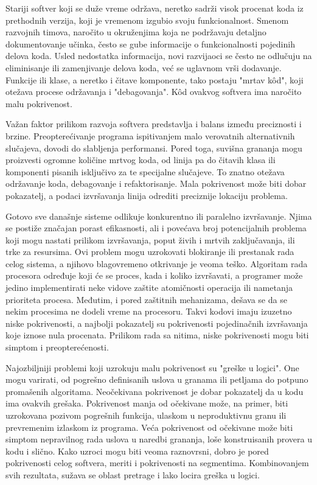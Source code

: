 \documentclass[12pt,oneside]{memoir}
\begin{document}
Stariji softver koji se duže vreme održava, neretko sadrži visok procenat koda iz prethodnih verzija, koji je vremenom izgubio svoju funkcionalnost. Smenom razvojnih timova, naročito u okruženjima koja ne podržavaju detaljno dokumentovanje učinka, često se gube informacije o funkcionalnosti pojedinih delova koda. Usled nedostatka informacija, novi razvijaoci se često ne odlučuju na eliminisanje ili zamenjivanje delova koda, već se uglavnom vrši dodavanje. Funkcije ili klase, a neretko i čitave komponente, tako postaju "mrtav k\^{o}d", koji otežava procese održavanja i "debagovanja". K\^{o}d ovakvog softvera ima naročito malu pokrivenost.

Važan faktor prilikom razvoja softvera predstavlja i balans između preciznosti i brzine. Preopterećivanje programa ispitivanjem malo verovatnih alternativnih slučajeva, dovodi do slabljenja performansi. Pored toga, suvišna grananja mogu proizvesti ogromne količine mrtvog koda, od linija pa do čitavih klasa ili komponenti pisanih isključivo za te specijalne slučajeve. To znatno otežava održavanje koda, debagovanje i refaktorisanje. Mala pokrivenost može biti dobar pokazatelj, a podaci izvršavanja linija odrediti preciznije lokaciju problema.

Gotovo sve današnje sisteme odlikuje konkurentno ili paralelno izvršavanje. Njima se postiže značajan porast efikasnosti, ali i povećava broj potencijalnih problema koji mogu nastati prilikom izvršavanja, poput živih i mrtvih zaključavanja, ili trke za resursima. Ovi problem mogu uzrokovati blokiranje ili prestanak rada celog sistema, a njihovo blagovremeno otkrivanje je veoma teško. Algoritam rada procesora određuje koji će se proces, kada i koliko izvršavati, a programer može jedino implementirati neke vidove zaštite atomičnosti operacija ili nametanja prioriteta procesa. Međutim, i pored zaštitnih mehanizama, dešava se da se nekim procesima ne dodeli vreme na procesoru. Takvi kodovi imaju izuzetno niske pokrivenosti, a najbolji pokazatelj su pokrivenosti pojedinačnih izvršavanja koje iznose nula procenata. Prilikom rada sa nitima, niske pokrivenosti mogu biti simptom i preopterećenosti. 

Najozbiljniji problemi koji uzrokuju malu pokrivenost su "greške u logici". One mogu varirati, od pogrešno definisanih uslova u granama ili petljama do potpuno promašenih algoritama. Neočekivana pokrivenost je dobar pokazatelj da u kodu ima ovakvih grešaka. Pokrivenost manja od očekivane može, na primer, biti uzrokovana pozivom pogrešnih funkcija, ulaskom u neproduktivnu granu ili prevremenim izlaskom iz programa. Veća pokrivenost od očekivane može biti simptom nepravilnog rada uslova u naredbi grananja, loše konstruisanih provera u kodu i slično. Kako uzroci mogu biti veoma raznovrsni, dobro je pored pokrivenosti celog softvera, meriti i pokrivenosti na segmentima. Kombinovanjem svih rezultata, sužava se oblast pretrage i lako locira greška u logici. 
\end{document}
